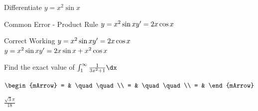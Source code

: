 \clearpage\noindent%
\begin{mtask}
\task Differentiate $y= x^2 \sin{x}$
\begin{tcbraster}[raster columns=2,
				  raster equal height=rows,
			      enhanced]
\begin{boxA}[styleDashedTitle]{Common Error - Product Rule}{
         $  y=x^2\sin{x}  \\
	        y'=2x\cos{x}
	     $
}\end{boxA}%
\begin{boxA}[styleDashedTitle, segmentation style={dashed, black},]{Correct Working}{
         $ y=x^2\sin{x}  \\
	       y'=2x\cos{x}
	     $ \\
		\tcbline
         $ y=x^2\sin{x}  \\
	       y'=2x\sin{x}+x^2\cos{x}
	     $ \\	
}\end{boxA}%
\end{tcbraster}
\end{mtask}



\clearpage\noindent%
\begin{mtask}[resume]
   \task \begin{exercise} Find the exact value of $\int_{1}^{\infty} \frac{1}{3x^2+1} \dx$
           \begin{envSolution}
             $\begin{mArrow}
                 = & \quad \quad              \\
		   		 = & \quad \quad              \\
				 = &  
              \end{mArrow}$
            \begin{shortsolution}  
			     $\frac{\sqrt{3}\pi}{18}$
			\end{shortsolution}				 
           \end{envSolution}
         \end{exercise}
     
\end{mtask}
\clearpage\noindent%
\pShortSolutionSubsection
\printshortsolutions
